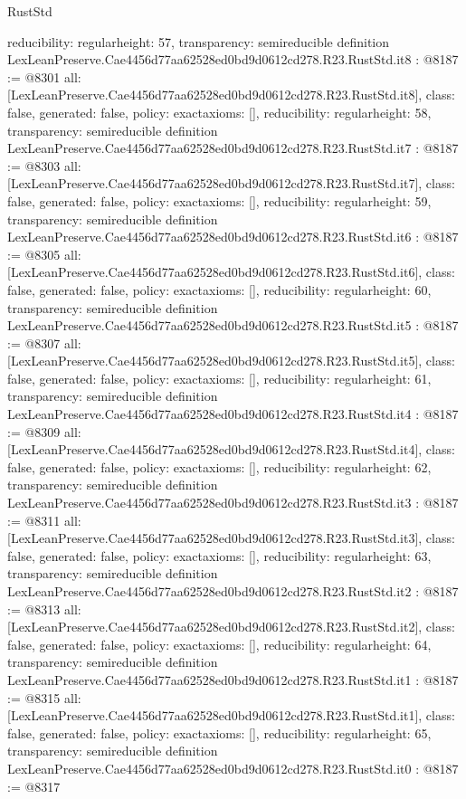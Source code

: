 \begin{lexlean}{RustStd}
\begin{coremodule}
{  reducibility: regular{height: 57},
  transparency: semireducible
}
definition LexLeanPreserve.Cae4456d77aa62528ed0bd9d0612cd278.R23.RustStd.it8 : @8187 := @8301 {
  all: [LexLeanPreserve.Cae4456d77aa62528ed0bd9d0612cd278.R23.RustStd.it8],
  class: false,
  generated: false,
  policy: exact{axioms: []},
  reducibility: regular{height: 58},
  transparency: semireducible
}
definition LexLeanPreserve.Cae4456d77aa62528ed0bd9d0612cd278.R23.RustStd.it7 : @8187 := @8303 {
  all: [LexLeanPreserve.Cae4456d77aa62528ed0bd9d0612cd278.R23.RustStd.it7],
  class: false,
  generated: false,
  policy: exact{axioms: []},
  reducibility: regular{height: 59},
  transparency: semireducible
}
definition LexLeanPreserve.Cae4456d77aa62528ed0bd9d0612cd278.R23.RustStd.it6 : @8187 := @8305 {
  all: [LexLeanPreserve.Cae4456d77aa62528ed0bd9d0612cd278.R23.RustStd.it6],
  class: false,
  generated: false,
  policy: exact{axioms: []},
  reducibility: regular{height: 60},
  transparency: semireducible
}
definition LexLeanPreserve.Cae4456d77aa62528ed0bd9d0612cd278.R23.RustStd.it5 : @8187 := @8307 {
  all: [LexLeanPreserve.Cae4456d77aa62528ed0bd9d0612cd278.R23.RustStd.it5],
  class: false,
  generated: false,
  policy: exact{axioms: []},
  reducibility: regular{height: 61},
  transparency: semireducible
}
definition LexLeanPreserve.Cae4456d77aa62528ed0bd9d0612cd278.R23.RustStd.it4 : @8187 := @8309 {
  all: [LexLeanPreserve.Cae4456d77aa62528ed0bd9d0612cd278.R23.RustStd.it4],
  class: false,
  generated: false,
  policy: exact{axioms: []},
  reducibility: regular{height: 62},
  transparency: semireducible
}
definition LexLeanPreserve.Cae4456d77aa62528ed0bd9d0612cd278.R23.RustStd.it3 : @8187 := @8311 {
  all: [LexLeanPreserve.Cae4456d77aa62528ed0bd9d0612cd278.R23.RustStd.it3],
  class: false,
  generated: false,
  policy: exact{axioms: []},
  reducibility: regular{height: 63},
  transparency: semireducible
}
definition LexLeanPreserve.Cae4456d77aa62528ed0bd9d0612cd278.R23.RustStd.it2 : @8187 := @8313 {
  all: [LexLeanPreserve.Cae4456d77aa62528ed0bd9d0612cd278.R23.RustStd.it2],
  class: false,
  generated: false,
  policy: exact{axioms: []},
  reducibility: regular{height: 64},
  transparency: semireducible
}
definition LexLeanPreserve.Cae4456d77aa62528ed0bd9d0612cd278.R23.RustStd.it1 : @8187 := @8315 {
  all: [LexLeanPreserve.Cae4456d77aa62528ed0bd9d0612cd278.R23.RustStd.it1],
  class: false,
  generated: false,
  policy: exact{axioms: []},
  reducibility: regular{height: 65},
  transparency: semireducible
}
definition LexLeanPreserve.Cae4456d77aa62528ed0bd9d0612cd278.R23.RustStd.it0 : @8187 := @8317 {
}
\end{coremodule}
\end{lexlean}
